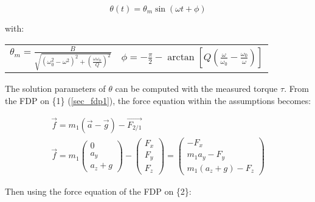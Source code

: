 \documentclass[a4paper, 11pt]{article}
\begin{document}
\begin{equation}
  \label{theta2d}
  \theta(t) = \theta_m \sin(\omega t + \phi)
\end{equation}


with:
{\centering
 \begin{tabular}{cc}
  $\theta_m = \frac{B}{\sqrt{{(\omega_0^2 - \omega^2)}^2 + {\left( \frac{\omega \omega_0}{Q}\right)}^2}}$
    & $\phi = - \frac{\pi}{2} - \arctan \left[ Q \left( \frac{\omega}{\omega_0} - \frac{\omega_0}{\omega} \right) \right] $ \\
 \end{tabular}
 \par}

\vspace{0.5cm}

The solution parameters of $\theta$ can be computed with the measured torque $\tau$. From the FDP on \{1\} (\ref{sec_fdp1}), the force equation within the assumptions becomes:

\begin{gather}
  \label{fdp1_2d}
 \overrightarrow{f} = m_1 (\overrightarrow{a} - \overrightarrow{g}) - \overrightarrow{F_{2/1}} \\
 \overrightarrow{f} = m_1
 \begin{pmatrix}
  0  \\
  a_y  \\
  a_z + g
 \end{pmatrix}
 - \begin{pmatrix}
 F_x \\
 F_y \\
 F_z
 \end{pmatrix}
 = \begin{pmatrix}
 - F_x \\
 m_1 a_y - F_y \\
 m_1 (a_z + g) - F_z
 \end{pmatrix}
\end{gather}

%

Then using the force equation of the FDP on \{2\}:
\end{document}
